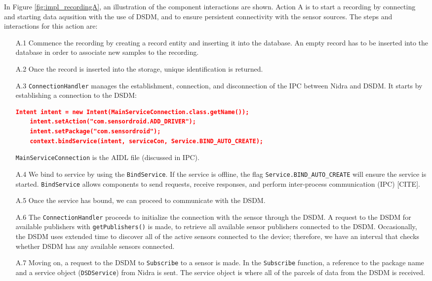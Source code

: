In Figure \ref{fig:impl_recordingA}, an illustration of the component interactions are shown. Action A is to start a recording by connecting and starting data aqusition with the use of DSDM, and to ensure persistent connectivity with the sensor sources. The steps and interactions for this action are: 

\begin{itemize}
    \item[A.1] Commence the recording by creating a record entity and inserting it into the database. An empty record has to be inserted into the database in order to associate new samples to the recording. 
    \item[A.2] Once the record is inserted into the storage, unique identification is returned. 
    \item[A.3] \verb|ConnectionHandler| manages the establishment, connection, and disconnection of the IPC between Nidra and DSDM. It starts by establishing a connection to the DSDM:
\begin{lstlisting}[language=json, caption={My Caption}, captionpos=b]
    Intent intent = new Intent(MainServiceConnection.class.getName());
    intent.setAction("com.sensordroid.ADD_DRIVER");
    intent.setPackage("com.sensordroid");
    context.bindService(intent, serviceCon, Service.BIND_AUTO_CREATE);
\end{lstlisting}
    \verb|MainServiceConnection| is the AIDL file (discussed in IPC).
    \item[A.4] We bind to service by using the \verb|BindService|. If the service is offline, the flag \verb|Service.BIND_AUTO_CREATE| will ensure the service is started. \verb|BindService| allows components to send requests, receive responses, and perform inter-process communication (IPC) [CITE]. 
    \item[A.5] Once the service has bound, we can proceed to communicate with the DSDM. 
   	\item[A.6] The \verb|ConnectionHandler| proceeds to initialize the connection with the sensor through the DSDM.  A request to the DSDM for available publishers with \verb|getPublishers()| is made, to retrieve all available sensor publishers connected to the DSDM. Occasionally, the DSDM uses extended time to discover all of the active sensors connected to the device; therefore, we have an interval that checks whether DSDM has any available sensors connected.
	\item[A.7] Moving on,  a request to the DSDM to \verb|Subscribe| to a sensor is made.  In the \verb|Subscribe| function, a reference to the package name and a service object (\verb|DSDService|) from Nidra is sent. The service object is where all of the parcels of data from the DSDM is received.   

\end{itemize}
